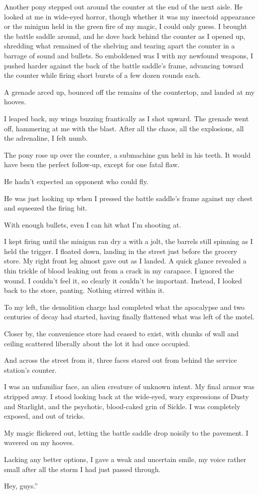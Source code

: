 Another pony stepped out around the counter at the end of the next aisle. He looked at me in wide-eyed horror, though whether it was my insectoid appearance or the minigun held in the green fire of my magic, I could only guess. I brought the battle saddle around, and he dove back behind the counter as I opened up, shredding what remained of the shelving and tearing apart the counter in a barrage of sound and bullets. So emboldened was I with my newfound weapons, I pushed harder against the back of the battle saddle’s frame, advancing toward the counter while firing short bursts of a few dozen rounds each.

A grenade arced up, bounced off the remains of the countertop, and landed at my hooves.

I leaped back, my wings buzzing frantically as I shot upward. The grenade went off, hammering at me with the blast. After all the chaos, all the explosions, all the adrenaline, I felt numb.

The pony rose up over the counter, a submachine gun held in his teeth. It would have been the perfect follow-up, except for one fatal flaw.

He hadn’t expected an opponent who could fly.

He was just looking up when I pressed the battle saddle’s frame against my chest and squeezed the firing bit.

With enough bullets, even I can hit what I’m shooting at.

I kept firing until the minigun ran dry a with a jolt, the barrels still spinning as I held the trigger. I floated down, landing in the street just before the grocery store. My right front leg almost gave out as I landed. A quick glance revealed a thin trickle of blood leaking out from a crack in my carapace. I ignored the wound. I couldn’t feel it, so clearly it couldn’t be important. Instead, I looked back to the store, panting. Nothing stirred within it.

To my left, the demolition charge had completed what the apocalypse and two centuries of decay had started, having finally flattened what was left of the motel.

Closer by, the convenience store had ceased to exist, with chunks of wall and ceiling scattered liberally about the lot it had once occupied.

And across the street from it, three faces stared out from behind the service station’s counter.

I was an unfamiliar face, an alien creature of unknown intent. My final armor was stripped away. I stood looking back at the wide-eyed, wary expressions of Dusty and Starlight, and the psychotic, blood-caked grin of Sickle. I was completely exposed, and out of tricks.

My magic flickered out, letting the battle saddle drop noisily to the pavement. I wavered on my hooves.

Lacking any better options, I gave a weak and uncertain smile, my voice rather small after all the storm I had just passed through.

\leavevmode{}Hey, guys.”